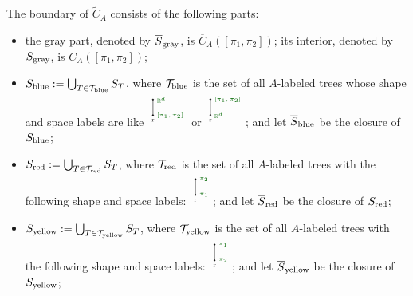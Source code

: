 \documentclass[11pt]{article}
\theoremstyle{definition}
\theoremstyle{remark}
\def\wt#1{\widetilde{#1}}
\def\ov#1{\overline{#1}}
\def\sgray{{\textnormal{gray}}}
\def\sred{{\textnormal{red}}}
\def\syellow{{\textnormal{yellow}}}
\def\sblue{{\textnormal{blue}}}
\def\R{\mathbb{R}}
\def\cT{\mathcal{T}}
\begin{document}
The boundary of $\wt{C}_A$ consists of the following parts: 
\begin{itemize}
\item the gray part, denoted by $\ov{S}_\sgray$, is $\ov{C}_A([\pi_1,\pi_2])$; its interior, denoted by $S_\sgray$, is $C_A([\pi_1,\pi_2])$; 
\item ${S}_\sblue:=\bigcup_{T\in\cT_\sblue}S_T$, where $\cT_\sblue$ is the set of all $A$-labeled trees whose shape and space labels are like
$\begin{tikzpicture}
\node [below] at (0,0) {\tiny{r}};  
\node [right, black!60!green] at (0,0) {\tiny{$[\pi_1,\pi_2]$}};
\node [right, black!60!green] at (0,0.5) {\tiny{$\R^d$}};
\draw [fill] (0,0) circle [radius=0.02];
\draw [fill] (0,0.5) circle [radius=0.02];
\draw (0,0) -- (0,0.5);
\end{tikzpicture}$ or 
$\begin{tikzpicture}
\node [below] at (0,0) {\tiny{r}};  
\node [right, black!60!green] at (0,0) {\tiny{$\R^d$}};
\node [right, black!60!green] at (0,0.5) {\tiny{$[\pi_1,\pi_2]$}};
\draw [fill] (0,0) circle [radius=0.02];
\draw [fill] (0,0.5) circle [radius=0.02];
\draw (0,0) -- (0,0.5);
\end{tikzpicture}$;
and let $\ov{S}_\sblue$ be the closure of $S_\sblue$;
\item ${S}_\sred:=\bigcup_{T\in\cT_\sred}S_T$, where $\cT_\sred$ is the set of all $A$-labeled trees with the following shape and space labels: 
$\begin{tikzpicture}
\node [below] at (0,0) {\tiny{r}};  
\node [right, black!60!green] at (0,0) {\tiny{$\pi_1$}};
\node [right, black!60!green] at (0,0.5) {\tiny{$\pi_2$}};
\draw [fill] (0,0) circle [radius=0.02];
\draw [fill] (0,0.5) circle [radius=0.02];
\draw (0,0) -- (0,0.5);
\end{tikzpicture}$;
and let $\ov{S}_\sred$ be the closure of $S_\sred$;
\item ${S}_\syellow:=\bigcup_{T\in\cT_\syellow}S_T$, where $\cT_\syellow$ is the set of all $A$-labeled trees with the following shape and space labels: 
$\begin{tikzpicture}
\node [below] at (0,0) {\tiny{r}};  
\node [right, black!60!green] at (0,0) {\tiny{$\pi_2$}};
\node [right, black!60!green] at (0,0.5) {\tiny{$\pi_1$}};
\draw [fill] (0,0) circle [radius=0.02];
\draw [fill] (0,0.5) circle [radius=0.02];
\draw (0,0) -- (0,0.5);
\end{tikzpicture}$;
and let $\ov{S}_\syellow$ be the closure of $S_\syellow$; 
\end{itemize}
\end{document}
